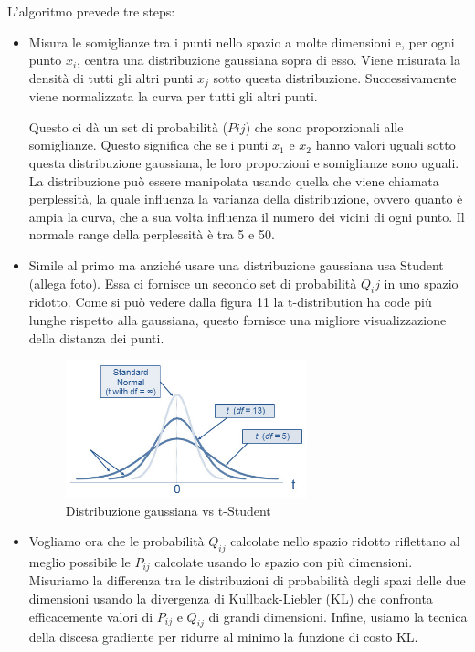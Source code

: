 \documentclass[12pt,italian]{report}
\begin{document}
L'algoritmo prevede tre steps:
\begin{itemize}
	\item Misura le somiglianze tra i punti nello spazio a molte dimensioni e, per ogni punto $x_i$, centra una distribuzione gaussiana sopra di esso. Viene misurata la densità di tutti gli altri punti $x_j$ sotto questa distribuzione.
	Successivamente viene normalizzata la curva per tutti gli altri punti.
	
	Questo ci dà un set di probabilità ($Pij$) che sono proporzionali alle somiglianze. Questo significa che se i punti $x_1$ e $x_2$ hanno valori uguali sotto questa distribuzione gaussiana, le loro proporzioni e somiglianze sono uguali. La distribuzione può essere manipolata usando quella che viene chiamata perplessità, la quale influenza la varianza della distribuzione, ovvero quanto è ampia la curva, che a sua volta influenza  il numero dei vicini di ogni punto. Il normale range della perplessità è tra 5 e 50.
	\item Simile al primo ma anziché usare una distribuzione gaussiana usa Student (allega foto). Essa ci fornisce un secondo set di probabilità $Q_ij$ in uno spazio ridotto. Come si può vedere dalla figura 11 la t-distribution ha code più lunghe rispetto alla gaussiana, questo fornisce una migliore visualizzazione della distanza dei punti.
	
	\begin{figure}[h]
		\centering
		\includegraphics[width = 70mm]{immagini/t-dist1}
		\caption{Distribuzione gaussiana vs t-Student}
	\end{figure}
	\item Vogliamo ora che le probabilità $Q_{ij}$ calcolate nello spazio ridotto riflettano al meglio possibile le $P_{ij}$ calcolate usando lo spazio con più dimensioni. 
	Misuriamo la differenza tra le distribuzioni di probabilità degli spazi delle due dimensioni usando la divergenza di Kullback-Liebler (KL) che confronta efficacemente valori di $P_{ij}$ e $Q_{ij}$ di grandi dimensioni. Infine, usiamo la tecnica della discesa gradiente per ridurre al minimo la funzione di costo KL.
\end{itemize}
\end{document}
